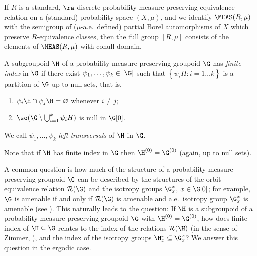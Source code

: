 \begin{example}\label{examplefullgroupofequivalencerelation}
If $R$ is a standard, $\ra$-discrete probability-measure preserving equivalence relation on a (standard) probability space $(X,\mu)$, and we identify $\MEAS(R,\mu)$ with the semigroup of ($\mu$-a.e.\ defined) partial Borel automorphisms of $X$ which preserve $R$-equivalence classes, then the full group $[R,\mu]$ consists of the elements of $\MEAS(R,\mu)$ with conull domain.
\end{example}

\begin{definition}
A subgroupoid $\H$ of a probability measure-preserving groupoid $\G$ has \emph{finite index} in $\G$ if there exist $\psi_1,\ldots,\psi_k\in[\G]$ such that $\left\{\psi_iH:i=1\ldots k\right\}$ is a partition of $\G$ up to null sets, that is,
\begin{enumerate}
\item[(i)] $\psi_i\H\cap\psi_j\H=\varnothing$ whenever $i\neq j$;
\item[(ii)] $\so(\G\setminus\bigcup_{i=1}^k\psi_iH)$ is null in $\G[0]$.
\end{enumerate}
We call $\psi_1,\ldots,\psi_k$ \emph{left transversals} of $\H$ in $\G$.
\end{definition}

Note that if $\H$ has finite index in $\G$ then $\H^{(0)}=\G^{(0)}$ (again, up to null sets).

A common question is how much of the structure of a probability measure-preserving groupoid $\G$ can be described by the structures of the orbit equivalence relation $\mathcal{R}(\G)$ and the isotropy groups $\G_x^x$, $x\in\G[0]$; for example, $\G$ is amenable if and only if $\mathcal{R}(\G)$  is amenable and a.e.\ isotropy group $\G_x^x$ is amenable (see \cite[Theorem 4.2.7]{MR1799683}). This naturally leads to the question: If $\H$ is a subgroupoid of a probability measure-preserving groupoid $\G$ with $\H^{(0)}=\G^{(0)}$, how does finite index of $\H\subseteq\G$ relates to the index of the relations $\mathcal{R}(\H)$ (in the sense of Zimmer, \cite{MR1007409}), and the index of the isotropy groups $\H_x^x\subseteq\G_x^x$? We answer this question in the ergodic case.

